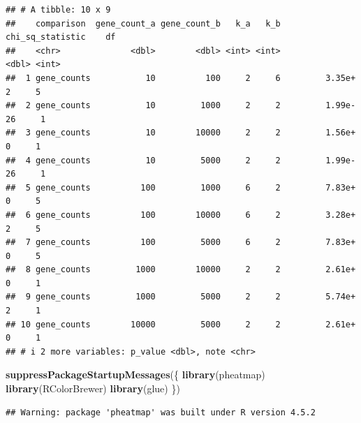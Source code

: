 \documentclass[
]{article}
\newenvironment{Shaded}{\begin{snugshade}}{\end{snugshade}}
\newcommand{\FunctionTok}[1]{\textcolor[rgb]{0.13,0.29,0.53}{\textbf{#1}}}
\newcommand{\NormalTok}[1]{#1}
\begin{document}
\begin{verbatim}
## # A tibble: 10 x 9
##    comparison  gene_count_a gene_count_b   k_a   k_b chi_sq_statistic    df
##    <chr>              <dbl>        <dbl> <int> <int>            <dbl> <int>
##  1 gene_counts           10          100     2     6         3.35e+ 2     5
##  2 gene_counts           10         1000     2     2         1.99e-26     1
##  3 gene_counts           10        10000     2     2         1.56e+ 0     1
##  4 gene_counts           10         5000     2     2         1.99e-26     1
##  5 gene_counts          100         1000     6     2         7.83e+ 0     5
##  6 gene_counts          100        10000     6     2         3.28e+ 2     5
##  7 gene_counts          100         5000     6     2         7.83e+ 0     5
##  8 gene_counts         1000        10000     2     2         2.61e+ 0     1
##  9 gene_counts         1000         5000     2     2         5.74e+ 2     1
## 10 gene_counts        10000         5000     2     2         2.61e+ 0     1
## # i 2 more variables: p_value <dbl>, note <chr>
\end{verbatim}

\begin{Shaded}
\begin{Highlighting}[]
\FunctionTok{suppressPackageStartupMessages}\NormalTok{(\{}
  \FunctionTok{library}\NormalTok{(pheatmap)}
  \FunctionTok{library}\NormalTok{(RColorBrewer)}
  \FunctionTok{library}\NormalTok{(glue)}
\NormalTok{\})}
\end{Highlighting}
\end{Shaded}

\begin{verbatim}
## Warning: package 'pheatmap' was built under R version 4.5.2
\end{verbatim}
\end{document}
